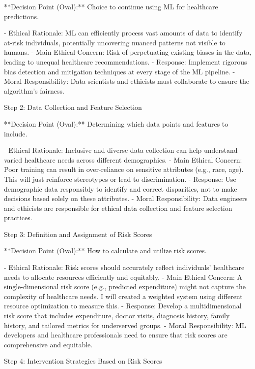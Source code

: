 \documentclass[submit]{harvardml}
\begin{document}
**Decision Point (Oval):** Choice to continue using ML for healthcare predictions.

- Ethical Rationale: ML can efficiently process vast amounts of data to identify at-risk individuals, potentially uncovering nuanced patterns not visible to humans.
- Main Ethical Concern: Risk of perpetuating existing biases in the data, leading to unequal healthcare recommendations.
- Response: Implement rigorous bias detection and mitigation techniques at every stage of the ML pipeline.
- Moral Responsibility: Data scientists and ethicists must collaborate to ensure the algorithm's fairness. 
\newline

Step 2: Data Collection and Feature Selection

**Decision Point (Oval):** Determining which data points and features to include.

- Ethical Rationale: Inclusive and diverse data collection can help understand varied healthcare needs across different demographics.
- Main Ethical Concern: Poor training can result in over-reliance on sensitive attributes (e.g., race, age). This will just reinforce stereotypes or lead to discrimination.
- Response: Use demographic data responsibly to identify and correct disparities, not to make decisions based solely on these attributes.
- Moral Responsibility: Data engineers and ethicists are responsible for ethical data collection and feature selection practices.
\newline 

Step 3: Definition and Assignment of Risk Scores

**Decision Point (Oval):** How to calculate and utilize risk scores.

- Ethical Rationale: Risk scores should accurately reflect individuals' healthcare needs to allocate resources efficiently and equitably.
- Main Ethical Concern: A single-dimensional risk score (e.g., predicted expenditure) might not capture the complexity of healthcare needs. I will created a weighted system using different resource optimization to measure this. 
- Response: Develop a multidimensional risk score that includes expenditure, doctor visits, diagnosis history, family history, and tailored metrics for underserved groups.
- Moral Responsibility: ML developers and healthcare professionals need to ensure that risk scores are comprehensive and equitable.
\newline 

Step 4: Intervention Strategies Based on Risk Scores
\end{document}
